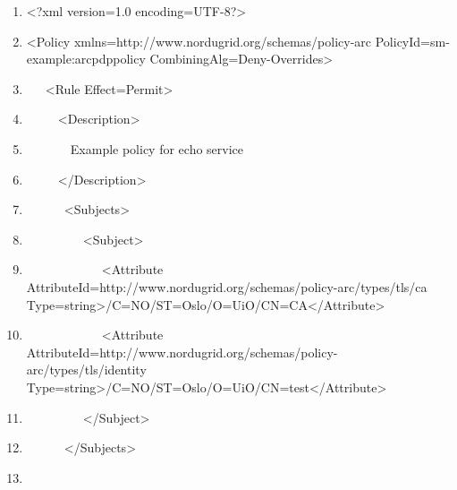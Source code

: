 \documentclass[a4paper]{article}
\newcommand\liststyleWWviiiNumxiv{%
\renewcommand\theenumi{\arabic{enumi}}
\renewcommand\theenumii{\arabic{enumii}}
\renewcommand\theenumiii{\arabic{enumiii}}
\renewcommand\theenumiv{\arabic{enumiv}}
\renewcommand\labelenumi{\theenumi.}
\renewcommand\labelenumii{\theenumii.}
\renewcommand\labelenumiii{\theenumiii.}
\renewcommand\labelenumiv{\theenumiv.}
}
\begin{document}
\liststyleWWviiiNumxiv
\begin{enumerate}
\item {\ttfamily\color{black}
{\textless}?xml version={\textquotedbl}1.0{\textquotedbl}
encoding={\textquotedbl}UTF-8{\textquotedbl}?{\textgreater}}
\item {\ttfamily\color{black}
{\textless}Policy
xmlns={\textquotedbl}http://www.nordugrid.org/schemas/policy-arc{\textquotedbl}
PolicyId={\textquotedbl}sm-example:arcpdppolicy{\textquotedbl}
CombiningAlg={\textquotedbl}Deny-Overrides{\textquotedbl}{\textgreater}}
\item {\ttfamily\color{black}
\ \ \ {\textless}Rule
Effect={\textquotedbl}Permit{\textquotedbl}{\textgreater}}
\item {\ttfamily\color{black}
\ \ \ \ \ {\textless}Description{\textgreater}}
\item {\ttfamily\color{black}
\ \ \ \ \ \ \ Example policy for echo service}
\item {\ttfamily\color{black}
\ \ \ \ \ {\textless}/Description{\textgreater}}
\item {\ttfamily\color{black}
\ \ \ \ \ \ {\textless}Subjects{\textgreater}}
\item {\ttfamily\color{black}
\ \ \ \ \ \ \ \ \ {\textless}Subject{\textgreater}}
\item {\ttfamily\color{black}
\ \ \ \ \ \ \ \ \ \ \ \ {\textless}Attribute
AttributeId={\textquotedbl}http://www.nordugrid.org/schemas/policy-arc/types/tls/ca{\textquotedbl}
Type={\textquotedbl}string{\textquotedbl}{\textgreater}/C=NO/ST=Oslo/O=UiO/CN=CA{\textless}/Attribute{\textgreater}}
\item {\ttfamily\color{black}
\ \ \ \ \ \ \ \ \ \ \ \ {\textless}Attribute
AttributeId={\textquotedbl}http://www.nordugrid.org/schemas/policy-arc/types/tls/identity{\textquotedbl}
Type={\textquotedbl}string{\textquotedbl}{\textgreater}/C=NO/ST=Oslo/O=UiO/CN=test{\textless}/Attribute{\textgreater}}
\item {\ttfamily\color{black}
\ \ \ \ \ \ \ \ \ {\textless}/Subject{\textgreater}}
\item {\ttfamily\color{black}
\ \ \ \ \ \ {\textless}/Subjects{\textgreater}}
\item {\ttfamily\color{black}
}
\end{enumerate}
\end{document}
